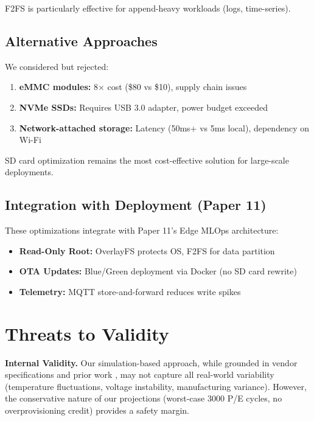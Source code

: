 \documentclass[conference]{IEEEtran}
\begin{document}
F2FS is particularly effective for append-heavy workloads (logs, time-series).

\subsection{Alternative Approaches}

We considered but rejected:
\begin{enumerate}
    \item \textbf{eMMC modules:} 8$\times$ cost (\$80 vs \$10), supply chain issues
    \item \textbf{NVMe SSDs:} Requires USB 3.0 adapter, power budget exceeded
    \item \textbf{Network-attached storage:} Latency (50ms+ vs 5ms local), dependency on Wi-Fi
\end{enumerate}

SD card optimization remains the most cost-effective solution for large-scale deployments.

\subsection{Integration with Deployment (Paper 11)}

These optimizations integrate with Paper 11's Edge MLOps architecture:
\begin{itemize}
    \item \textbf{Read-Only Root:} OverlayFS protects OS, F2FS for data partition
    \item \textbf{OTA Updates:} Blue/Green deployment via Docker (no SD card rewrite)
    \item \textbf{Telemetry:} MQTT store-and-forward reduces write spikes
\end{itemize}

\section{Threats to Validity}

\textbf{Internal Validity.} Our simulation-based approach, while grounded in vendor specifications and prior work \cite{b1}, may not capture all real-world variability (temperature fluctuations, voltage instability, manufacturing variance). However, the conservative nature of our projections (worst-case 3000 P/E cycles, no overprovisioning credit) provides a safety margin.
\end{document}
